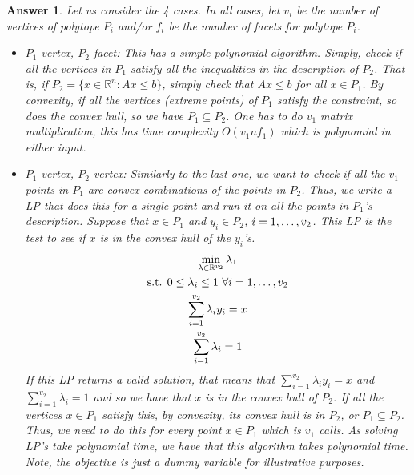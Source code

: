 \documentclass[12pt]{article}
\theoremstyle{colon}
\newtheorem*{answer}{Answer}
\begin{document}
\begin{answer}
  Let us consider the 4 cases. In all cases, let $v_i$ be the number of vertices of polytope $P_i$ and/or $f_i$ be the number of facets for polytope $P_i$.

  \begin{itemize}
      \item $P_1$ vertex, $P_2$ facet: This has a simple polynomial algorithm. Simply, check if all the vertices in $P_1$ satisfy all the inequalities in the description of $P_2$. That is, if $P_2 = \{x \in \mathbb{R}^n : Ax \leq b\}$, simply check that $Ax \leq b$ for all $x \in P_1$. By convexity, if all the vertices (extreme points) of $P_1$ satisfy the constraint, so does the convex hull, so we have $P_1 \subseteq P_2$. One has to do $v_1$ matrix multiplication, this has time complexity $O(v_1 n f_1)$ which is polynomial in either input.

      \item $P_1$ vertex, $P_2$ vertex: Similarly to the last one, we want to check if all the $v_1$ points in $P_1$ are convex combinations of the points in $P_2$. Thus, we write a LP that does this for a single point and run it on all the points in $P_1$'s description. Suppose that $x \in P_1$ and $y_i \in P_2$, $i=1,\mathellipsis,v_2$. This LP is the test to see if $x$ is in the convex hull of the $y_i$'s.
        \begin{gather*}
          \min_{\lambda \in \mathbb{R}^{v_2}} \lambda_1 \\
          \text{s.t. } 0 \leq \lambda_i \leq 1 \ \forall i = 1, \mathellipsis, v_2 \\
          \sum_{i=1}^{v_2} \lambda_i y_i = x \\
          \sum_{i=1}^{v_2} \lambda_i = 1
        \end{gather*}
        If this LP returns a valid solution, that means that $\sum_{i=1}^{v_2} \lambda_i y_i = x$ and $\sum_{i=1}^{v_2} \lambda_i = 1$ and so we have that $x$ is in the convex hull of $P_2$. If all the vertices $x \in P_1$ satisfy this, by convexity, its convex hull is in $P_2$, or $P_1 \subseteq P_2$. Thus, we need to do this for every point $x \in P_1$ which is $v_1$ calls. As solving LP's take polynomial time, we have that this algorithm takes polynomial time. Note, the objective is just a dummy variable for illustrative purposes.


\end{itemize}
\end{answer}
\end{document}
